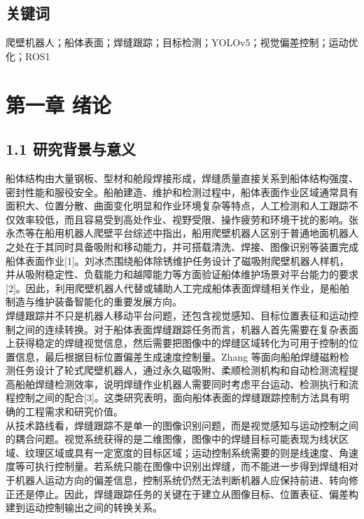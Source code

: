 \documentclass[UTF8,a4paper,12pt]{ctexrep}
\begin{document}
\section{关键词}

爬壁机器人；船体表面；焊缝跟踪；目标检测；YOLOv5；视觉偏差控制；运动优化；ROS1\\

\chapter*{第一章 绪论}

\section{1.1 研究背景与意义}

船体结构由大量钢板、型材和舱段焊接形成，焊缝质量直接关系到船体结构强度、密封性能和服役安全。船舶建造、维护和检测过程中，船体表面作业区域通常具有面积大、位置分散、曲面变化明显和作业环境复杂等特点，人工检测和人工跟踪不仅效率较低，而且容易受到高处作业、视野受限、操作疲劳和环境干扰的影响。张永杰等在船用机器人爬壁平台综述中指出，船用爬壁机器人区别于普通地面机器人之处在于其同时具备吸附和移动能力，并可搭载清洗、焊接、图像识别等装置完成船体表面作业[1]。刘冰杰围绕船体除锈维护任务设计了磁吸附爬壁机器人样机，并从吸附稳定性、负载能力和越障能力等方面验证船体维护场景对平台能力的要求[2]。因此，利用爬壁机器人代替或辅助人工完成船体表面焊缝相关作业，是船舶制造与维护装备智能化的重要发展方向。\\

焊缝跟踪并不只是机器人移动平台问题，还包含视觉感知、目标位置表征和运动控制之间的连续转换。对于船体表面焊缝跟踪任务而言，机器人首先需要在复杂表面上获得稳定的焊缝视觉信息，然后需要把图像中的焊缝区域转化为可用于控制的位置信息，最后根据目标位置偏差生成速度控制量。Zhang 等面向船舶焊缝磁粉检测任务设计了轮式爬壁机器人，通过永久磁吸附、柔顺检测机构和自动检测流程提高船舶焊缝检测效率，说明焊缝作业机器人需要同时考虑平台运动、检测执行和流程控制之间的配合[3]。这类研究表明，面向船体表面的焊缝跟踪控制方法具有明确的工程需求和研究价值。\\

从技术路线看，焊缝跟踪不是单一的图像识别问题，而是视觉感知与运动控制之间的耦合问题。视觉系统获得的是二维图像，图像中的焊缝目标可能表现为线状区域、纹理区域或具有一定宽度的目标区域；运动控制系统需要的则是线速度、角速度等可执行控制量。若系统只能在图像中识别出焊缝，而不能进一步得到焊缝相对于机器人运动方向的偏差信息，控制系统仍然无法判断机器人应保持前进、转向修正还是停止。因此，焊缝跟踪任务的关键在于建立从图像目标、位置表征、偏差构建到运动控制输出之间的转换关系。\\
\end{document}
